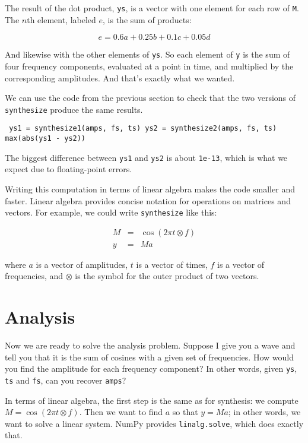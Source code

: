 \documentclass[12pt]{book} \usepackage[width=5.5in,height=8.5in, hmarginratio=3:2,vmarginratio=1:1]{geometry}
\begin{document}
The result of the dot product, {\tt ys}, is a vector with one element for each row of {\tt M}. The $n$th element, labeled $e$, is the sum of products: 

%
\[ e = 0.6 a + 0.25 b + 0.1 c + 0.05 d \] 

%
And likewise with the other elements of {\tt ys}. So each element of {\tt y} is the sum of four frequency components, evaluated at a point in time, and multiplied by the corresponding amplitudes. And that's exactly what we wanted. 

We can use the code from the previous section to check that the two versions of {\tt synthesize} produce the same results. 

\begin{verbatim} ys1 = synthesize1(amps, fs, ts) ys2 = synthesize2(amps, fs, ts) max(abs(ys1 - ys2)) \end{verbatim} 

The biggest difference between {\tt ys1} and {\tt ys2} is about {\tt 1e-13}, which is what we expect due to floating-point errors. 

Writing this computation in terms of linear algebra makes the code smaller and faster. Linear algebra provides concise notation for operations on matrices and vectors. For example, we could write {\tt synthesize} like this: 

%
\begin{eqnarray*} M &=& \cos (2 \pi t \otimes f) \\ y &=& M a \end{eqnarray*} 

%
where $a$ is a vector of amplitudes, $t$ is a vector of times, $f$ is a vector of frequencies, and $\otimes$ is the symbol for the outer product of two vectors. 

\section{Analysis} \label{analysis} 

Now we are ready to solve the analysis problem. Suppose I give you a wave and tell you that it is the sum of cosines with a given set of frequencies. How would you find the amplitude for each frequency component? In other words, given {\tt ys}, {\tt ts} and {\tt fs}, can you recover {\tt amps}? 

In terms of linear algebra, the first step is the same as for synthesis: we compute $M = \cos (2 \pi t \otimes f)$. Then we want to find $a$ so that $y = M a$; in other words, we want to solve a linear system. NumPy provides {\tt linalg.solve}, which does exactly that. 
\end{document}
